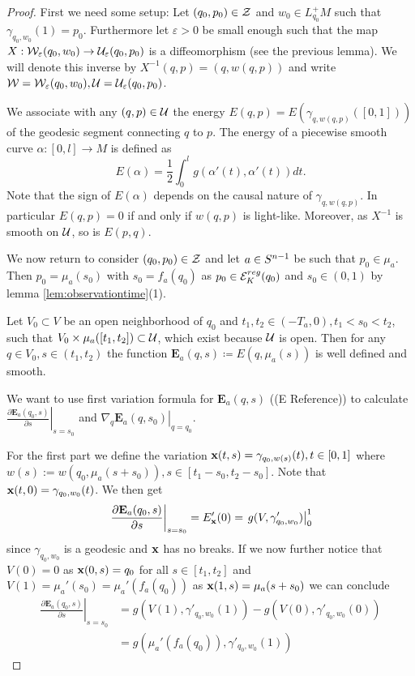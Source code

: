 \begin{proof}
    First we need some setup: Let $(q_0,p_0)\in {\mathcal{Z}}$ and $w_0\in L^+_{q_0}M$ such that $\gamma_{q_0,w_0}(1) = p_0$. Furthermore let $\varepsilon>0$ be small enough such that the map $X:{\mathcal{W}}_\varepsilon(q_0,w_0)\to \mathcal{U}_\varepsilon(q_0,p_0)$ is a diffeomorphism (see the previous lemma). We will denote this inverse by $X^{-1}(q,p) = (q,w(q,p))$ and write ${\mathcal{W}}={\mathcal{W}}_\varepsilon(q_0,w_0), \mathcal{U}=\mathcal{U}_\varepsilon(q_0,p_0)$.
    
    We associate with any $(q,p)\in {\mathcal{U}}$ the energy $E(q,p)=E(\gamma_{q,w(q,p)}([0,1]))$ of the geodesic segment connecting $q$ to $p$. The energy of a piecewise smooth curve $\alpha:[0,l]\to M$ is defined as 
    \[
        E(\alpha) = \frac{1}{2}\int_0^l g(\alpha'(t),\alpha'(t))dt.
    \]
    Note that the sign of $E(\alpha)$ depends on the causal nature of $\gamma_{q,w(q,p)}$. In particular $E(q,p)=0$ if and only if $w(q,p)$ is light-like. Moreover, as $X^{-1}$ is smooth on $\mathcal{U}$, so is $E(p,q)$.
    
    We now return to consider $(q_0,p_0)\in {\mathcal{Z}}$ and let $a\in {S^{n-1}}$ be such that $p_0 \in \mu_a$. Then $p_0=\mu_a(s_0)$ with $s_0=f_a(q_0)$ as $p_0 \in {{\mathcal{E}}^{reg}_K}(q_0)$ and $s_0\in (0,1)$ by lemma \ref{lem:observationtime}(1). 
    
    Let $V_0\subset V$ be an open neighborhood of $q_0$ and $t_1,t_2\in (-T_a,0), t_1<s_0<t_2$, such that $V_0\times\mu_a([t_1,t_2])\subset \mathcal{U}$, which exist because $\mathcal{U}$ is open. Then for any $q\in V_0, s\in (t_1,t_2)$ the function $\mathbf{E}_a(q,s)\coloneqq E(q,\mu_a(s))$ is well defined and smooth.
    
    We want to use first variation formula for $\mathbf{E}_a(q,s)$ ((E Reference)) to calculate $\left.\frac{\partial\mathbf{E}_a(q_0,s)}{\partial s}\right\rvert_{s=s_0}$ and $\left.\nabla_q\mathbf{E}_a(q,s_0)\right\rvert_{q=q_0}$.
    
    For the first part we define the variation $\mathbf{x}(t,s) = \gamma_{q_0,w(s)}(t), t\in [0,1]$ where $w(s):= w(q_0,\mu_a(s+s_0)), s\in [t_1-s_0,t_2-s_0]$. Note that $\mathbf{x}(t,0)=\gamma_{q_0,w_0}(t)$. We then get
    \begin{align*}
        \left.\frac{\partial\mathbf{E}_a(q_0,s)}{\partial s}\right\rvert_{s=s_0} = E'_{\mathbf{x}}(0) =  \left.g(V,\gamma_{q_0,w_0}')\right\rvert^1_0
    \end{align*}
    since $\gamma_{q_0,w_0}$ is a geodesic and $\mathbf{x}$ has no breaks. If we now further notice that $V(0)=0$ as $\mathbf{x}(0,s)=q_0$ for all $s\in[t_1,t_2]$ and $V(1) = \mu_a'(s_0) = \mu_a'(f_a(q_0))$ as $\mathbf{x}(1,s) = \mu_a(s+s_0)$ we can conclude 
    \begin{align*}
        \left.\frac{\partial\mathbf{E}_a(q_0,s)}{\partial s}\right\rvert_{s=s_0} &= g(V(1),\gamma'_{q_0,w_0}(1)) - g(V(0),\gamma'_{q_0,w_0}(0))\\
        &= g(\mu_a'(f_a(q_0)),\gamma'_{q_0,w_0}(1))
    \end{align*}
    

\end{proof}
